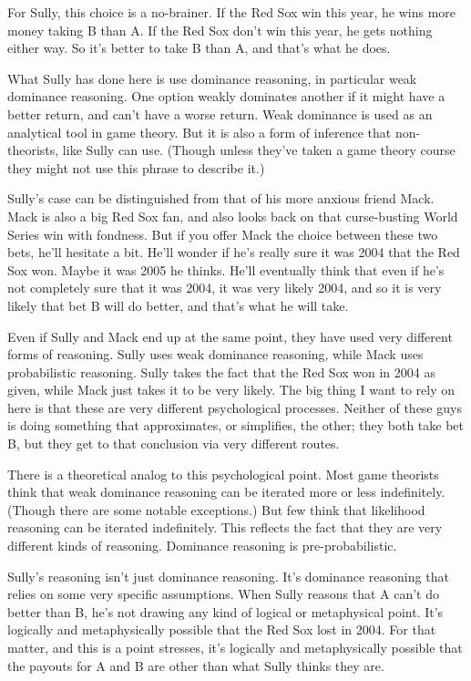 \documentclass[11pt,]{book}
\begin{document}
For Sully, this choice is a no-brainer. If the Red Sox win this year, he wins more money taking B than A. If the Red Sox don't win this year, he gets nothing either way. So it's better to take B than A, and that's what he does.

What Sully has done here is use dominance reasoning, in particular weak dominance reasoning. One option weakly dominates another if it might have a better return, and can't have a worse return. Weak dominance is used as an analytical tool in game theory. But it is also a form of inference that non-theorists, like Sully can use. (Though unless they've taken a game theory course they might not use this phrase to describe it.)

Sully's case can be distinguished from that of his more anxious friend Mack. Mack is also a big Red Sox fan, and also looks back on that curse-busting World Series win with fondness. But if you offer Mack the choice between these two bets, he'll hesitate a bit. He'll wonder if he's really sure it was 2004 that the Red Sox won. Maybe it was 2005 he thinks. He'll eventually think that even if he's not completely sure that it was 2004, it was very likely 2004, and so it is very likely that bet B will do better, and that's what he will take.

Even if Sully and Mack end up at the same point, they have used very different forms of reasoning. Sully uses weak dominance reasoning, while Mack uses probabilistic reasoning. Sully takes the fact that the Red Sox won in 2004 as given, while Mack just takes it to be very likely. The big thing I want to rely on here is that these are very different psychological processes. Neither of these guys is doing something that approximates, or simplifies, the other; they both take bet B, but they get to that conclusion via very different routes.

There is a theoretical analog to this psychological point. Most game theorists think that weak dominance reasoning can be iterated more or less indefinitely. (Though there are some notable exceptions.) But few think that likelihood reasoning can be iterated indefinitely. This reflects the fact that they are very different kinds of reasoning. Dominance reasoning is pre-probabilistic.

Sully's reasoning isn't just dominance reasoning. It's dominance reasoning that relies on some very specific assumptions. When Sully reasons that A can't do better than B, he's not drawing any kind of logical or metaphysical point. It's logically and metaphysically possible that the Red Sox lost in 2004. For that matter, and this is a point \citet{Ganson2019} stresses, it's logically and metaphysically possible that the payouts for A and B are other than what Sully thinks they are.
\end{document}
